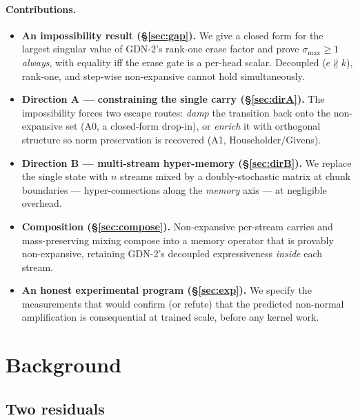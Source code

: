 \documentclass[11pt,letterpaper,logo]{yalearxiv}
\newcommand{\smax}{\sigma_{\max}}
\begin{document}
\paragraph{Contributions.}
\begin{itemize}[leftmargin=1.5em,itemsep=1pt,topsep=2pt]
  \item \textbf{An impossibility result (\S\ref{sec:gap}).} We give a closed form
  for the largest singular value of GDN-2's rank-one erase factor and prove
  $\smax \ge 1$ \emph{always}, with equality iff the erase gate is a per-head
  scalar. Decoupled ($e \not\parallel k$), rank-one, and step-wise non-expansive
  cannot hold simultaneously.
  \item \textbf{Direction A --- constraining the single carry (\S\ref{sec:dirA}).}
  The impossibility forces two escape routes: \emph{damp} the transition back onto
  the non-expansive set (A0, a closed-form drop-in), or \emph{enrich} it with
  orthogonal structure so norm preservation is recovered (A1, Householder/Givens).
  \item \textbf{Direction B --- multi-stream hyper-memory (\S\ref{sec:dirB}).} We
  replace the single state with $n$ streams mixed by a doubly-stochastic matrix at
  chunk boundaries --- hyper-connections along the \emph{memory} axis --- at
  negligible overhead.
  \item \textbf{Composition (\S\ref{sec:compose}).} Non-expansive per-stream carries
  and mass-preserving mixing compose into a memory operator that is provably
  non-expansive, retaining GDN-2's decoupled expressiveness \emph{inside} each
  stream.
  \item \textbf{An honest experimental program (\S\ref{sec:exp}).} We specify the
  measurements that would confirm (or refute) that the predicted non-normal
  amplification is consequential at trained scale, before any kernel work.
\end{itemize}


\section{Background}
\label{sec:bg}

\subsection{Two residuals}
\label{sec:two-residuals}
\end{document}
